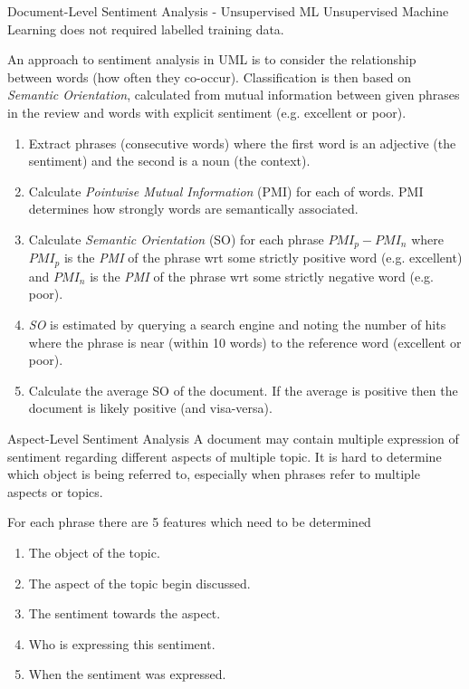 \documentclass[11pt,a4paper]{article}
\begin{document}
  \begin{proposition}{Document-Level Sentiment Analysis - Unsupervised ML}
    Unsupervised Machine Learning does not required labelled training data.
    \par An approach to sentiment analysis in UML is to consider the relationship between words (how often they co-occur). Classification is then based on \textit{Semantic Orientation}, calculated from mutual information between given phrases in the review and words with explicit sentiment (e.g. excellent or poor).
    \begin{enumerate}
      \item Extract phrases (consecutive words) where the first word is an adjective (the sentiment) and the second is a noun (the context).
      \item Calculate \textit{Pointwise Mutual Information} (PMI) for each of words. PMI determines how strongly words are semantically associated.
      \item Calculate \textit{Semantic Orientation} (SO) for each phrase $PMI_p-PMI_n$ where $PMI_p$ is the \textit{PMI} of the phrase wrt some strictly positive word (e.g. excellent) and $PMI_n$ is the \textit{PMI} of the phrase wrt some strictly negative word (e.g. poor).
      \item \textit{SO} is estimated by querying a search engine and noting the number of hits where the phrase is near (within 10 words) to the reference word (excellent or poor).
      \item Calculate the average SO of the document. If the average is positive then the document is likely positive (and visa-versa).
    \end{enumerate}
  \end{proposition}

  \begin{proposition}{Aspect-Level Sentiment Analysis}
    A document may contain multiple expression of sentiment regarding different aspects of multiple topic. It is hard to determine which object is being referred to, especially when phrases refer to multiple aspects or topics.
    \par For each phrase there are 5 features which need to be determined
    \begin{enumerate}
      \item The object of the topic.
      \item The aspect of the topic begin discussed.
      \item The sentiment towards the aspect.
      \item Who is expressing this sentiment.
      \item When the sentiment was expressed.
    \end{enumerate}
  \end{proposition}
\end{document}
